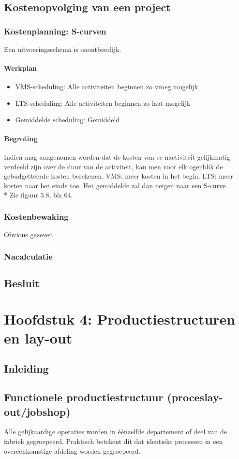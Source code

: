 \documentclass[12pt]{article}
\begin{document}
\subsection{Kostenopvolging van een project}
\subsubsection{Kostenplanning: S-curven}
Een uitvoeringsschema is onontbeerlijk.
\paragraph{Werkplan}
\begin{itemize}
\item VMS-scheduling: Alle activiteiten beginnen zo vroeg mogelijk
\item LTS-scheduling: Alle activiteiten beginnen zo laat mogelijk
\item Gemiddelde scheduling: Gemiddeld
\end{itemize}
\paragraph{Begroting}
Indien mag aangenomen worden dat de kosten van ee nactiviteit gelijkmatig verdeeld zijn over de duur van de activiteit, kan men voor elk ogenblik de gebudgetteerde kosten berekenen. VMS: meer kosten in het begin, LTS: meer kosten naar het einde toe. Het gemiddelde zal dan neigen naar een S-curve.\\*
Zie figuur 3.8, blz 64.
\subsubsection{Kostenbewaking}
Obvious gezever.
\subsubsection{Nacalculatie}
\subsection{Besluit}
\clearpage
\section{Hoofdstuk 4: Productiestructuren en lay-out}
\subsection{Inleiding}
\subsection{Functionele productiestructuur (proceslay-out/jobshop)}
Alle gelijkaardige operaties worden in \'e\'enzelfde departement of deel van de fabriek gegroepeerd. Praktisch betekent dit dat identieke processen in een overeenkomstige afdeling worden gegroepeerd.
\end{document}
